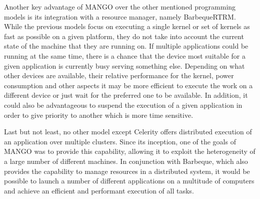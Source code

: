 Another key advantage of MANGO over the other mentioned programming models is its integration with a resource manager, namely BarbequeRTRM. While the previous models focus on executing a single kernel or set of kernels as fast as possible on a given platform, they do not take into account the current state of the machine that they are running on. If multiple applications could be running at the same time, there is a chance that the device most suitable for a given application is currently busy serving something else. Depending on what other devices are available, their relative performance for the kernel, power consumption and other aspects it may be more efficient to execute the work on a different device or just wait for the preferred one to be available. In addition, it could also be advantageous to suspend the execution of a given application in order to give priority to another which is more time sensitive.

Last but not least, no other model except Celerity offers distributed execution of an application over multiple clusters. Since its inception, one of the goals of MANGO was to provide this capability, allowing it to exploit the heterogeneity of a large number of different machines. In conjunction with Barbeque, which also provides the capability to manage resources in a distributed system, it would be possible to launch a number of different applications on a multitude of computers and achieve an efficient and performant execution of all tasks.
